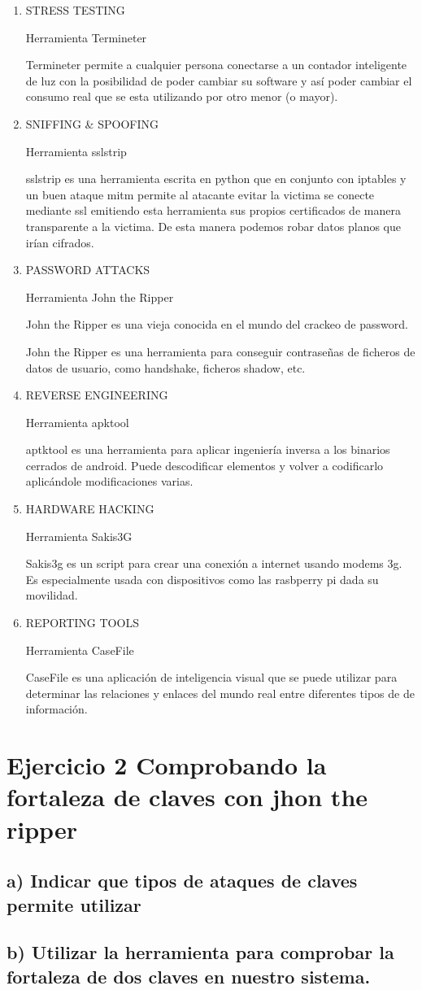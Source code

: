 \documentclass[a4paper]{article}
\begin{document}
\begin{enumerate}
\item STRESS TESTING

Herramienta Termineter

Termineter permite a cualquier persona conectarse a un contador inteligente de luz con la posibilidad de poder cambiar su software y así poder cambiar el consumo real que se esta utilizando por otro menor (o mayor).


\item SNIFFING \& SPOOFING


Herramienta sslstrip

sslstrip es una herramienta escrita en python que en conjunto con iptables y un buen ataque mitm permite al atacante evitar la victima se conecte mediante ssl emitiendo esta herramienta sus propios certificados de manera transparente a la victima. De esta manera podemos robar datos planos que irían cifrados.


\item PASSWORD ATTACKS

Herramienta John the Ripper

John the Ripper es una vieja conocida en el mundo del crackeo de password.

John the Ripper es una herramienta para conseguir contraseñas de ficheros de datos de usuario, como handshake, ficheros shadow, etc. 


\item REVERSE ENGINEERING

Herramienta apktool

aptktool es una herramienta para aplicar ingeniería inversa a los binarios cerrados de android. Puede descodificar elementos y volver a codificarlo aplicándole modificaciones varias.   



\item HARDWARE HACKING

Herramienta Sakis3G

Sakis3g es un script para crear una conexión a internet usando modems 3g. Es especialmente usada con dispositivos como las rasbperry pi dada su movilidad.


\item REPORTING TOOLS

Herramienta CaseFile

CaseFile es una aplicación de inteligencia visual que se puede utilizar para determinar las relaciones y enlaces del mundo real entre diferentes tipos de  de información.



\end{enumerate}

\section{Ejercicio 2  Comprobando la fortaleza de claves con jhon the ripper}

\subsection{ a) Indicar que tipos de ataques de claves permite utilizar }


\subsection{ b) Utilizar la herramienta para comprobar la fortaleza de dos claves en nuestro sistema.}
\end{document}
